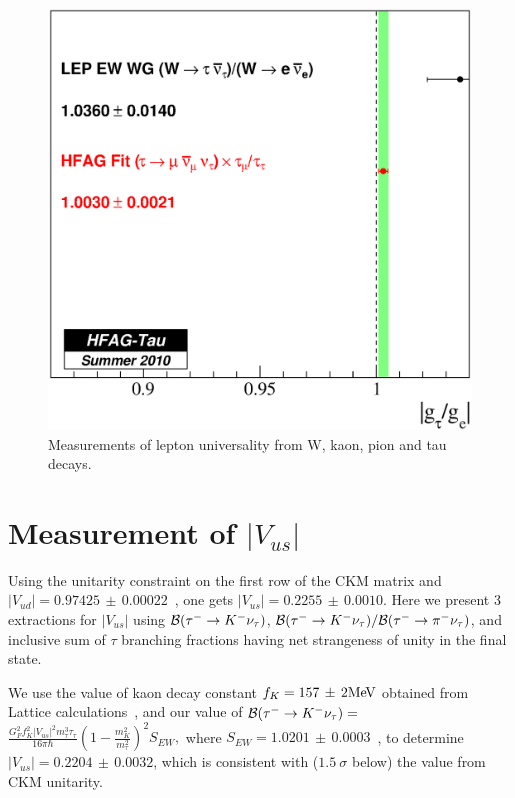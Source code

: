 \documentclass[fleqn,twoside]{article}
\newcommand{\mev}{\ensuremath{\mathrm{Me\kern -0.1em V}}\xspace}
\def\Vus  {\ensuremath{|V_{us}|}\xspace}
\def\Vud  {\ensuremath{|V_{ud}|}\xspace}
\begin{document}
\begin{figure}[!hbtp]
\begin{center}
\begin{minipage}{.42\textwidth}
\includegraphics[height=.3\textheight]{figures/gtauge.eps}
\end{minipage}
\end{center}
\caption{Measurements of lepton universality from W, kaon, pion and tau decays.}
\label{fig:TauLU}
\end{figure}

\section{Measurement of $|V_{us}|$}
\label{sec:Tau_Vus}

\newcommand{\Vudvalue} {\ensuremath{0.97425\, \pm\, 0.00022}\xspace}

Using the unitarity constraint on the first row of the CKM matrix
and $\Vud = \Vudvalue$~\cite{Hardy:2008gy}, one gets $\Vus = 0.2255\, \pm\, 0.0010$.
Here we present 3 extractions for $|V_{us}|$ using
${\cal{B}}({\tau^-\to K^-\nu_\tau})$, 
${{\cal{B}}({\tau^- \to K^-\nu_\tau})}/
{{\cal{B}}({\tau^- \to \pi^-\nu_\tau})}$,
and inclusive sum of $\tau$ branching fractions having net strangeness of unity in the final state.

We use the value of kaon decay constant $f_K = 157\, \pm\, 2 \mev$ 
obtained from Lattice calculations~\cite{Follana:2007uv}, 
and our value of ${\cal{B}}({\tau^-\to K^-\nu_\tau}) =$
$\frac{G^2_F f^2_K \Vus^2 m^3_{\tau} \tau_{\tau}}{16\pi\hbar} \left (1 - \frac{m_K^2}{m_\tau^2} \right )^2 S_{EW},$
where $S_{EW} = 1.0201\, \pm\, 0.0003$~\cite{Erler:2002mv},
to determine $\Vus= 0.2204\, \pm\, 0.0032$,
which is consistent with ($1.5~\sigma$ below) the value from CKM unitarity.
\end{document}

